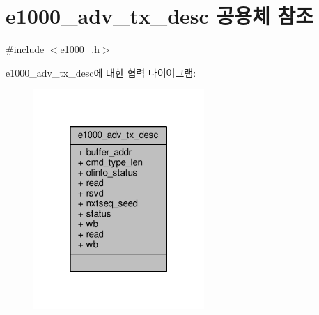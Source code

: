 \hypertarget{unione1000__adv__tx__desc}{}\section{e1000\+\_\+adv\+\_\+tx\+\_\+desc 공용체 참조}
\label{unione1000__adv__tx__desc}


{\ttfamily \#include $<$e1000\+\_.\+h$>$}



e1000\+\_\+adv\+\_\+tx\+\_\+desc에 대한 협력 다이어그램\+:
\nopagebreak
\begin{figure}[H]
\begin{center}
\leavevmode
\includegraphics[width=184pt]{unione1000__adv__tx__desc__coll__graph}
\end{center}
\end{figure}
